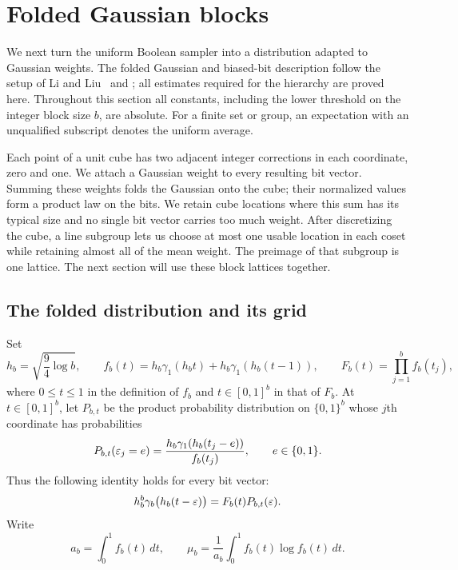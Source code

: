 \section{Folded Gaussian blocks}
\label{sec:blocks}

We next turn the uniform Boolean sampler into a distribution adapted to
Gaussian weights. The folded Gaussian and biased-bit description follow
the setup of Li and Liu~\cite[Section~3]{LL} and
\cite[Section~2]{LLC}; all estimates required for the hierarchy are
proved here.  Throughout this section all constants, including the
lower threshold on the integer block size $b$, are absolute.  For a finite
set or group, an expectation with an unqualified subscript denotes the
uniform average.

Each point of a unit cube has two adjacent integer corrections in each
coordinate, zero and one. We attach a Gaussian weight to every resulting
bit vector. Summing these weights folds the Gaussian onto the cube; their
normalized values form a product law on the bits. We retain cube locations
where this sum has its typical size and no single bit vector carries too
much weight. After discretizing the cube, a line subgroup lets us choose
at most one usable location in each coset while retaining almost all
of the mean weight.
The preimage of that subgroup is one lattice. The next section will use
these block lattices together.

\subsection{The folded distribution and its grid}

Set
\begin{equation}
 h_b=\sqrt{\frac94\log b},\qquad
 f_b(t)=h_b\gamma_1(h_bt)+h_b\gamma_1(h_b(t-1)),\qquad
 F_b(t)=\prod_{j=1}^b f_b(t_j),
 \label{eq:folded-density}
\end{equation}
where $0\le t\le1$ in the definition of $f_b$ and
$t\in[0,1]^b$ in that of $F_b$.  At $t\in[0,1]^b$, let $P_{b,t}$ be the
product probability distribution on $\{0,1\}^b$ whose $j$th coordinate has
probabilities
\[
 P_{b,t}(\varepsilon_j=e)
   =\frac{h_b\gamma_1(h_b(t_j-e))}{f_b(t_j)},\qquad e\in\{0,1\}.
\]
Thus the following identity holds for every bit vector:
\begin{equation}
 h_b^b\gamma_b\bigl(h_b(t-\varepsilon)\bigr)
       =F_b(t)P_{b,t}(\varepsilon).
 \label{eq:folded-identity}
\end{equation}
Write
\[
 a_b=\int_0^1 f_b(t)\,dt,\qquad
 \mu_b=\frac1{a_b}\int_0^1f_b(t)\log f_b(t)\,dt.
\]

